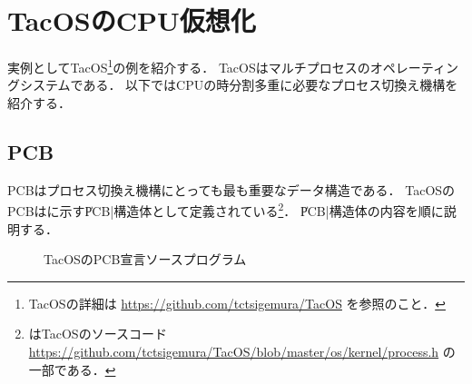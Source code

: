\section{TacOSのCPU仮想化}
実例としてTacOS\footnote{TacOSの詳細は
\url{https://github.com/tctsigemura/TacOS}
を参照のこと．}の例を紹介する．
TacOSはマルチプロセスのオペレーティングシステムである．
以下ではCPUの時分割多重に必要なプロセス切換え機構を紹介する．

\subsection{PCB}
PCBはプロセス切換え機構にとっても最も重要なデータ構造である．
TacOSのPCBはに示す\|PCB|構造体として定義されている\footnote{
はTacOSのソースコード
\url{https://github.com/tctsigemura/TacOS/blob/master/os/kernel/process.h}
の一部である．}．
\|PCB|構造体の内容を順に説明する．

\begin{figure}[btp]

\caption{TacOSのPCB宣言ソースプログラム}
\label{fig:tacosPCB}
\end{figure}

